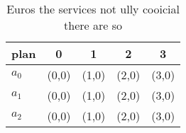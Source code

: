 \documentclass[a4paper]{article}
\begin{document}
\begin{table}
\begin{adjustbox}{width=0.5\columnwidth}
\begin{tabular}{|l|l|l|l|l|}
\hline
\textbf{plan} & \multicolumn{1}{c|}{\textbf{0}} & \multicolumn{1}{c|}{\textbf{1}} & \multicolumn{1}{c|}{\textbf{2}} & \multicolumn{1}{c|}{\textbf{3}} \\ \hline
\textbf{$a_0$}  & (0,0) & (1,0) & (2,0) & (3,0) \\ \hline
\textbf{$a_1$}  & (0,0) & (1,0) & (2,0) & (3,0) \\ \hline
\textbf{$a_2$}  & (0,0) & (1,0) & (2,0) & (3,0) \\ \hline
\end{tabular}
\end{adjustbox}
\caption{Euros the services not ully cooicial there are so
}
\end{table}
\end{document}
